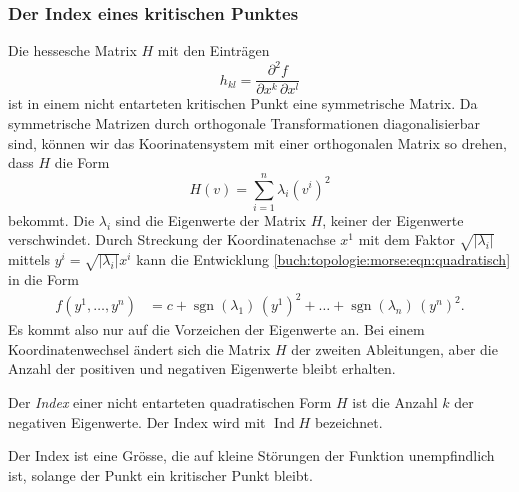 %
%
\subsubsection{Der Index eines kritischen Punktes}
Die hessesche Matrix $H$ mit den Einträgen
\[
h_{kl} = \frac{\partial^2 f}{\partial x^k\,\partial x^l}
\]
ist in einem nicht entarteten kritischen Punkt eine symmetrische
Matrix.
Da symmetrische Matrizen durch orthogonale Transformationen
diagonalisierbar sind, können wir das Koorinatensystem mit
einer orthogonalen Matrix so drehen, dass $H$ die Form
\[
H(v)
=
\sum_{i=1}^n \lambda_i (v^i)^2
\]
bekommt.
Die $\lambda_i$ sind die Eigenwerte der Matrix $H$, keiner
der Eigenwerte verschwindet.
Durch Streckung der Koordinatenachse $x^1$ mit dem Faktor
$\!\sqrt{|\lambda_i|}$  mittels
$y^i = \!\sqrt{|\lambda_i|}x^i$ kann die Entwicklung
\eqref{buch:topologie:morse:eqn:quadratisch}
in die Form
\begin{align*}
f(y^1,\dots,y^n)
&=
c
+
\operatorname{sgn}(\lambda_1)\,(y^1)^2
+
\dots
+
\operatorname{sgn}(\lambda_n)\,(y^n)^2.
\end{align*}
Es kommt also nur auf die Vorzeichen der Eigenwerte an.
Bei einem Koordinatenwechsel ändert sich die Matrix $H$ der zweiten
Ableitungen, aber die Anzahl der positiven und negativen Eigenwerte
bleibt erhalten.

\begin{definition}[Index]
%
Der \emph{Index} einer nicht entarteten quadratischen Form $H$ ist die
Anzahl $k$ der negativen Eigenwerte.
Der Index wird mit $\operatorname{Ind}H$ bezeichnet.
%
\end{definition}

Der Index ist eine Grösse, die auf kleine Störungen der Funktion
unempfindlich ist, solange der Punkt ein kritischer Punkt bleibt.

%
%
